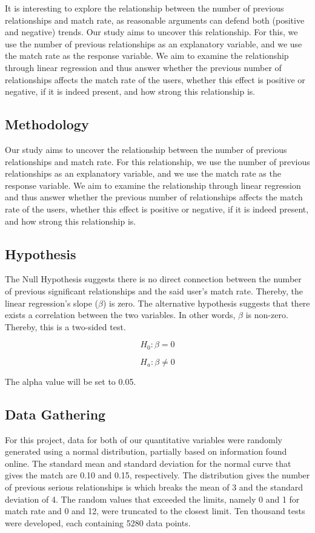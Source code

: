 \documentclass{article}
\begin{document}

It is interesting to explore the relationship between the number of previous relationships and match rate, as reasonable arguments can defend both (positive and negative) trends. Our study aims to uncover this relationship. For this, we use the number of previous relationships as an explanatory variable, and we use the match rate as the response variable. We aim to examine the relationship through linear regression and thus answer whether the previous number of relationships affects the match rate of the users, whether this effect is positive or negative, if it is indeed present, and how strong this relationship is. 

\subsection{Methodology}

Our study aims to uncover the relationship between the number of previous relationships and match rate. For this relationship, we use the number of previous relationships as an explanatory variable, and we use the match rate as the response variable. We aim to examine the relationship through linear regression and thus answer whether the previous number of relationships affects the match rate of the users, whether this effect is positive or negative, if it is indeed present, and how strong this relationship is. 

\subsection{Hypothesis}

The Null Hypothesis suggests there is no direct connection between the number of previous significant relationships and the said user's match rate. Thereby, the linear regression’s slope ($\beta$) is zero. The alternative hypothesis suggests that there exists a correlation between the two variables. In other words, $\beta$ is non-zero. Thereby, this is a two-sided test.

\[
H_0: \beta = 0
\]

\[
H_a: \beta \neq 0
\]

The alpha value will be set to 0.05.

\subsection{Data Gathering}
For this project, data for both of our quantitative variables were randomly generated using a normal distribution, partially based on information found online. The standard mean and standard deviation for the normal curve that gives the match are 0.10\cite{elad2024} and 0.15, respectively. The distribution gives the number of previous serious relationships is which breaks the mean of 3 and the standard deviation of 4. The random values that exceeded the limits, namely 0 and 1 for match rate and 0 and 12, were truncated to the closest limit. Ten thousand tests were developed, each containing 5280 data points. 
\end{document}
